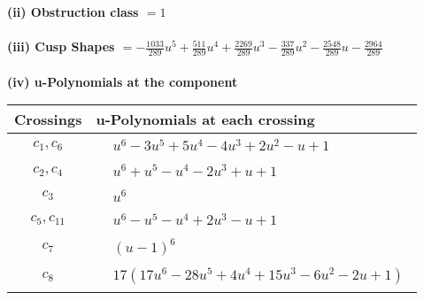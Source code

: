 \documentclass[1p]{elsarticle_modified}
\theoremstyle{definition}
\begin{document}
\flushleft \textbf{(ii) Obstruction class $= 1$}\\~\\
\flushleft \textbf{(iii) Cusp Shapes $= -\frac{1033}{289} u^5+\frac{511}{289} u^4+\frac{2269}{289} u^3-\frac{337}{289} u^2-\frac{2548}{289} u-\frac{2964}{289}$}\\~\\
\newpage\renewcommand{\arraystretch}{1}
\flushleft \textbf{(iv) u-Polynomials at the component}\newline \\
\begin{tabular}{m{50pt}|m{274pt}}
Crossings & \hspace{64pt}u-Polynomials at each crossing \\
\hline $$\begin{aligned}c_{1},c_{6}\end{aligned}$$&$\begin{aligned}
&u^6-3 u^5+5 u^4-4 u^3+2 u^2- u+1
\end{aligned}$\\
\hline $$\begin{aligned}c_{2},c_{4}\end{aligned}$$&$\begin{aligned}
&u^6+u^5- u^4-2 u^3+u+1
\end{aligned}$\\
\hline $$\begin{aligned}c_{3}\end{aligned}$$&$\begin{aligned}
&u^6
\end{aligned}$\\
\hline $$\begin{aligned}c_{5},c_{11}\end{aligned}$$&$\begin{aligned}
&u^6- u^5- u^4+2 u^3- u+1
\end{aligned}$\\
\hline $$\begin{aligned}c_{7}\end{aligned}$$&$\begin{aligned}
&(u-1)^6
\end{aligned}$\\
\hline $$\begin{aligned}c_{8}\end{aligned}$$&$\begin{aligned}
&17(17 u^6-28 u^5+4 u^4+15 u^3-6 u^2-2 u+1)
\end{aligned}$\\

\end{tabular}
\end{document}
